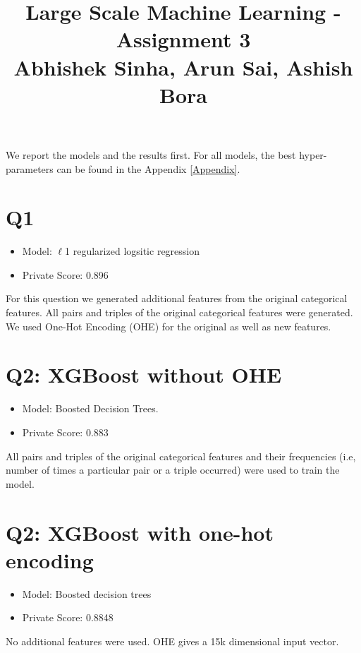 \documentclass{article}
\begin{document}
\title{Large Scale Machine Learning - Assignment 3\\Abhishek Sinha, Arun Sai, Ashish Bora}
\maketitle

We report the models and the results first. For all models, the best hyper-parameters can be found in the Appendix \ref{Appendix}.

\section{Q1}
\begin{itemize}
\item Model:  $\ell$1 regularized logsitic regression
\item Private Score: 0.896
\end{itemize}

For this question we generated additional features from the original categorical features. All pairs and triples of the original categorical features were generated. We used One-Hot Encoding (OHE) for the original as well as new features.

\section{Q2: XGBoost without OHE}

\begin{itemize}
\item Model:  Boosted Decision Trees. 
\item Private Score: 0.883
\end{itemize}

All pairs and triples of the original categorical features and their frequencies (i.e, number of times a particular pair or a triple occurred) were used to train the model.


\section{Q2: XGBoost with one-hot encoding}

\begin{itemize}
\item Model: Boosted decision trees
\item Private Score: 0.8848
\end{itemize}

No additional features were used. OHE gives a 15k dimensional input vector.  
\end{document}
